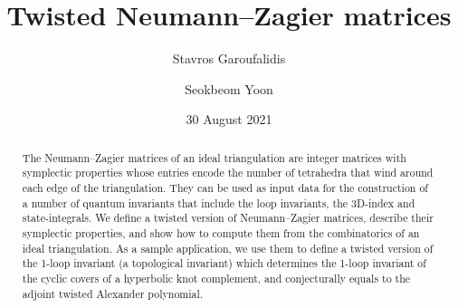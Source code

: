 \documentclass[12pt,reqno]{amsart}
\theoremstyle{definition}
\begin{document}
\title[Twisted Neumann--Zagier matrices]{Twisted Neumann--Zagier matrices}
\author{Stavros Garoufalidis}
\address{%
International Center for Mathematics, Department of Mathematics \\
Southern University of Science and Technology \\
Shenzhen, China \newline
{\tt \url{http://people.mpim-bonn.mpg.de/stavros}}}

\author{Seokbeom Yoon}
\address{Departament de Matem\`atiques \\
  Universitat Aut\`onoma de Barcelona \\
  Cerdanyola del Vall\`es, Spain \newline
{\tt \url{https://sites.google.com/view/seokbeom}}}



\date{30 August 2021}%

\begin{abstract}
  The Neumann--Zagier matrices of an ideal triangulation are integer matrices with
  symplectic properties whose entries encode the number of tetrahedra that wind around
  each edge of the triangulation. They can be used as input data for the construction
  of a number of quantum
  invariants that include the loop invariants, the 3D-index and state-integrals. 
  We define a twisted version of Neumann--Zagier matrices, describe their
  symplectic properties, and show how to compute them from the combinatorics of an ideal
  triangulation. As a sample application, we use them to define a twisted version of
  the 1-loop invariant (a topological invariant) which determines the 1-loop invariant
  of the cyclic covers of a hyperbolic knot complement, and conjecturally equals to the
  adjoint twisted Alexander polynomial.
\end{abstract}

\maketitle
\end{document}
